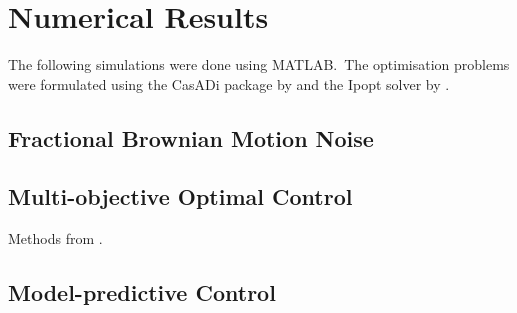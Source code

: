 \section{Numerical Results}

The following simulations were done using MATLAB.\ 
The optimisation problems were formulated using the CasADi package by \cite{Andersson2019casadi} and the Ipopt solver by \cite{Waechter2006ipopt}.\ 


\subsection{Fractional Brownian Motion Noise}

\subsection{Multi-objective Optimal Control}
Methods from \cite{hoffmann2022degoc}.

\subsection{Model-predictive Control}